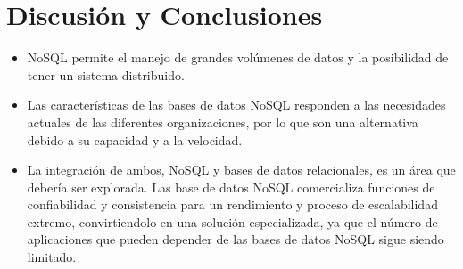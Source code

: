 \documentclass[%
 reprint,
 amsmath,amssymb,
 aps,
]{revtex4-1}
\begin{document}
\section{Discusión y Conclusiones}\label{sec:5}
	\begin{itemize}
		\item NoSQL permite el manejo de grandes volúmenes de datos y la posibilidad de tener un sistema distribuido.
		\item Las características de las bases de datos NoSQL responden a las necesidades actuales de las diferentes organizaciones, por lo que son una alternativa debido a su capacidad y a la velocidad.
		\item La integración de ambos, NoSQL y bases de datos relacionales, es un área que debería ser explorada. Las base de datos NoSQL comercializa funciones de confiabilidad y consistencia para un rendimiento y proceso de escalabilidad extremo, convirtiendolo en una solución especializada, ya que el número de aplicaciones que pueden depender de las bases de datos NoSQL sigue siendo limitado.
	\end{itemize}





\end{document}
